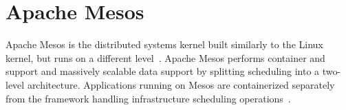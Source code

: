 \section{Apache Mesos}

Apache Mesos is the distributed systems kernel 
built similarly to the Linux kernel, but runs 
on a different level~\cite{hid-sp18-404-Apache2018}. 
Apache Mesos performs container and support and 
massively scalable data support by splitting 
scheduling into a two-level architecture. 
Applications running on Mesos are containerized separately 
from the framework handling infrastructure scheduling 
operations~\cite{hid-sp18-404-Mesos2018}.  